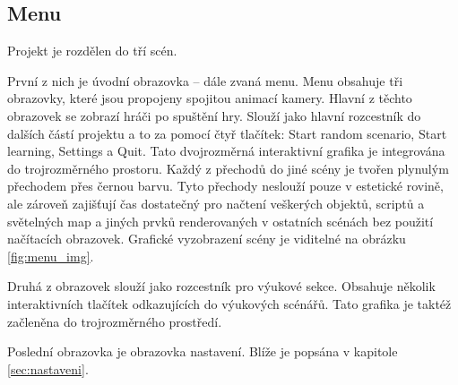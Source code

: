 \subsection{Menu}
Projekt je rozdělen do tří scén.

První z nich je úvodní obrazovka – dále zvaná menu. Menu obsahuje tři obrazovky, které jsou propojeny spojitou animací kamery. Hlavní z těchto obrazovek se zobrazí hráči po spuštění hry. Slouží jako hlavní rozcestník do dalších částí projektu a to za pomocí čtyř tlačítek: Start random scenario, Start learning, Settings a Quit. Tato dvojrozměrná interaktivní grafika je integrována do trojrozměrného prostoru. Každý z přechodů do jiné scény je tvořen plynulým přechodem přes černou barvu. Tyto přechody neslouží pouze v estetické rovině, ale zároveň zajišťují čas dostatečný pro načtení veškerých objektů, scriptů a světelných map a jiných prvků renderovaných v ostatních scénách bez použití načítacích obrazovek. Grafické vyzobrazení scény je viditelné na obrázku \ref{fig:menu_img}.

Druhá z obrazovek slouží jako rozcestník pro výukové sekce. Obsahuje několik interaktivních tlačítek odkazujících do výukových scénářů. Tato grafika je taktéž začleněna do trojrozměrného prostředí.

Poslední obrazovka je obrazovka nastavení. Blíže je popsána v kapitole \ref{sec:nastaveni}.
\\

